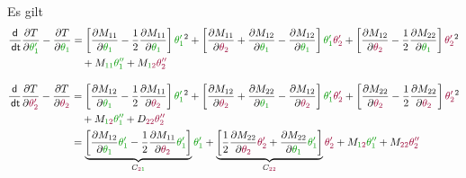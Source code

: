\documentclass[a4paper, 12pt]{scrartcl}
\newcommand{\gruen}[2][gruen]{\textcolor{#1}{#2}}
\newcommand{\dunkelrot}[2][dunkelrot]{\textcolor{#1}{#2}}
\newcommand{\dt}{\thinspace \mathsf{dt}}
\begin{document}
Es gilt 
\begin{align*}
    \frac{\mathsf{d}}{\dt} \frac{\partial T}{\partial \gruen{\theta_{1}'}}  - \frac{\partial T}{\partial \gruen{\theta_{1}}}
    &=
    \left[ \frac{\partial M_{11}}{\partial \gruen{\theta_{1}}} - \frac{1}{2}  \frac{\partial M_{11}}{\partial \gruen{\theta_{1}}} \right] \gruen{\theta_{1}'}^2
    + \left[ \frac{\partial M_{11}}{\partial \dunkelrot{\theta_{2}}} + \frac{\partial M_{12}}{\partial \gruen{\theta_{1}}} -  \frac{\partial M_{12}}{\partial \gruen{\theta_{1}}} \right] \gruen{\theta_{1}'} \dunkelrot{ \theta_{2}'} 
    + \left[\frac{\partial M_{12}}{\partial \dunkelrot{\theta_{2}}} - \frac{1}{2} \frac{\partial M_{22}}{\partial \gruen{\theta_{1}}} \right] \dunkelrot{\theta_{2}'}^2 \\
    & \quad
    +  M_{\gruen{1 1}} \gruen{\theta_{1}''} 
    + M_{\gruen{1}\dunkelrot{2}} \dunkelrot{\theta_{2}''}
\end{align*}

\begin{align*}
\frac{\mathsf{d}}{\dt} \frac{\partial T}{\partial \dunkelrot{\theta_{2}'}} - \frac{\partial T}{\partial \dunkelrot{\theta_{2}}}
&= 
\left[ \frac{\partial M_{12}}{\partial \gruen{\theta_{1}}} - \frac{1}{2} \frac{\partial M_{11}}{\partial \dunkelrot{\theta_{2}}} \right] \gruen{\theta_{1}'}^2 
+ \left[ \frac{\partial M_{12}}{\partial \dunkelrot{\theta_{2}}} + \frac{\partial M_{22}}{\partial \gruen{\theta_{1}}} - \frac{\partial M_{12}}{\partial \dunkelrot{\theta_{2}}} \right] \gruen{\theta_{1}'} \dunkelrot{\theta_{2}'} 
+ \left[ \frac{\partial M_{22}}{\partial \dunkelrot{\theta_{2}}} - \frac{1}{2} \frac{\partial M_{22}}{\partial \dunkelrot{\theta_{2}}} \right]  \dunkelrot{\theta_{2}'}^2 \\
& \quad + M_{\gruen{1}\dunkelrot{2}} \gruen{\theta_{1}''} + D_{\dunkelrot{22}} \dunkelrot{\theta_{2}''} \\
&=
\underbrace{\left[ \frac{\partial M_{12}}{\partial \gruen{\theta_{1}}} \gruen{\theta_{1}'} - \frac{1}{2} \frac{\partial M_{11}}{\partial \dunkelrot{\theta_{2}}} \gruen{\theta_{1}'} \right]}_{C_{\dunkelrot{2}\gruen{1}}} \gruen{\theta_{1}'}
+ \underbrace{\left[ \frac{1}{2} \frac{\partial M_{22}}{\partial \dunkelrot{\theta_{2}}}  \dunkelrot{\theta_{2}'} + \frac{\partial M_{22}}{\partial \gruen{\theta_{1}}} \gruen{\theta_{1}'} \right]}_{C_{\dunkelrot{22}}}  \dunkelrot{\theta_{2}'}
+ M_{\gruen{1}\dunkelrot{2}} \gruen{\theta_{1}''} + M_{\dunkelrot{22}} \dunkelrot{\theta_{2}''}
\end{align*}
\end{document}
